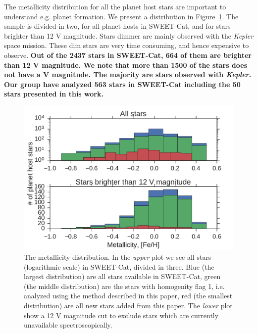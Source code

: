 \documentclass{aa}
\begin{document}
The metallicity distribution for all the planet host stars are important to
understand e.g. planet formation. We present a distribution in
Figure~\ref{fig:distribution}. The sample is divided in two, for all planet
hosts in SWEET-Cat, and for stars brighter than 12 V magnitude. Stars dimmer are
mainly observed with the \emph{Kepler} space mission. These dim stars are very
time consuming, and hence expensive to observe. {\bf Out of the 2437 stars in
SWEET-Cat, 664 of them are brighter than 12 V magnitude. We note that more than
1500 of the stars does not have a V magnitude. The majority are stars observed
with \emph{Kepler}. Our group have analyzed 563 stars in SWEET-Cat including
the 50 stars presented in this work.}


\begin{figure}[tpb]
    \centering
    \includegraphics[width=1.0\linewidth,natwidth=450,natheight=300]{figures/metallicityDistribution.pdf}
    \caption{The metallicity distribution. In the \emph{upper} plot we see all
             stars (logarithmic scale) in SWEET-Cat, divided in three. Blue
             (the largest distribution) are all stars available in SWEET-Cat,
             green (the middle distribution) are the stars with homogenity flag
             1, i.e. analyzed using the method described in this paper, red
             (the smallest distribution) are all new stars added from this
             paper. The \emph{lower} plot show a 12 V magnitude cut to exclude
             stars which are currently unavailable spectroscopically.}
    \label{fig:distribution}
\end{figure}
\end{document}
